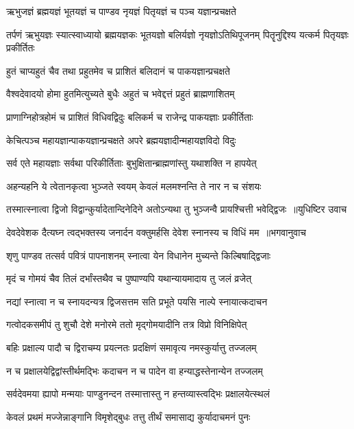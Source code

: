 \twolineshloka
{ऋभुजज्ञं ब्रह्मयज्ञं भूतयज्ञं च पाण्डव}
{नृयज्ञं पितृयज्ञं च पञ्च यज्ञान्प्रचक्षते}


\threelineshloka
{तर्पणं ऋभुयज्ञः स्यात्स्वाध्यायो ब्रह्मयज्ञकः}
{भूतयज्ञो बलिर्यज्ञो नृयज्ञोऽतिथिपूजनम्}
{पितॄनुद्दिश्य यत्कर्म पितृयज्ञः प्रकीर्तितः}


\twolineshloka
{हुतं चाप्यहुतं चैव तथा प्रहुतमेव च}
{प्राशितं बलिदानं च पाकयज्ञान्प्रचक्षते}


\twolineshloka
{वैश्वदेवादयो होमा हुतमित्युच्यते बुधैः}
{अहुतं च भवेद्दत्तं प्रहुतं ब्राह्मणाशितम्}


\twolineshloka
{प्राणाग्निहोत्रहोमं च प्राशितं विधिवद्विदुः}
{बलिकर्म च राजेन्द्र पाकयज्ञाः प्रकीर्तिताः}


\twolineshloka
{केचित्पञ्च महायज्ञान्पाकयज्ञान्प्रचक्षते}
{अपरे ब्रह्मयज्ञादीन्महायज्ञविदो विदुः}


\twolineshloka
{सर्व एते महायज्ञाः सर्वथा परिकीर्तिताः}
{बुभुक्षितान्ब्राह्मणांस्तु यथाशक्ति न हापयेत्}


\twolineshloka
{अहन्यहनि ये त्वेतानकृत्वा भुञ्जते स्वयम्}
{केवलं मलमश्नन्ति ते नार न च संशयः}


\threelineshloka
{तस्मात्स्नात्वा द्विजो विद्वान्कुर्यादेतान्दिनेदिने}
{अतोऽन्यथा तु भुञ्जन्वै प्रायश्चित्ती भवेद्द्विजः ॥युधिष्टिर उवाच}
{}


\threelineshloka
{देवदेवेशक दैत्यघ्न त्वद्भक्तस्य जनार्दन}
{वक्तुमर्हसि देवेश स्नानस्य च विधिं मम ॥भगवानुवाच}
{}


\twolineshloka
{शृणु पाण्डव तत्सर्व पवित्रं पापनाशनम्}
{स्नात्वा येन विधानेन मुच्यन्ते किल्बिषाद्द्विजाः}


\twolineshloka
{मृदं च गोमयं चैव तिलं दर्भांस्तथैव च}
{पुष्पाण्यपि यथान्यायमादाय तु जलं व्रजेत्}


\twolineshloka
{नद्यां स्नात्वा न च स्नायदन्यत्र द्विजसत्तम}
{सति प्रभूते पयसि नाल्पे स्नायात्कदाचन}


\twolineshloka
{गत्वोदकसमीपं तु शुचौ देशे मनोरमे}
{ततो मृद्गोमयादीनि तत्र विप्रो विनिक्षिपेत्}


\twolineshloka
{बहिः प्रक्षाल्य पादौ च द्विराचम्य प्रयत्नतः}
{प्रदक्षिणं समावृत्य नमस्कुर्यात्तु तज्जलम्}


\twolineshloka
{न च प्रक्षालयेद्विद्वांस्तीर्थमद्भिः कदाचन}
{न च पादेन वा हन्याद्धस्तेनान्येन तज्जलम्}


\twolineshloka
{सर्वदेवमया ह्यापो मन्मयाः पाण्डुनन्दन}
{तस्मात्तास्तु न हन्तव्यास्त्वद्भिः प्रक्षालयेत्स्थलं}


\twolineshloka
{केवलं प्रथमं मज्जेन्नाङ्गानि विमृशेद्बुधः}
{तत्तु तीर्थं समासाद्य कुर्यादाचमनं पुनः}


